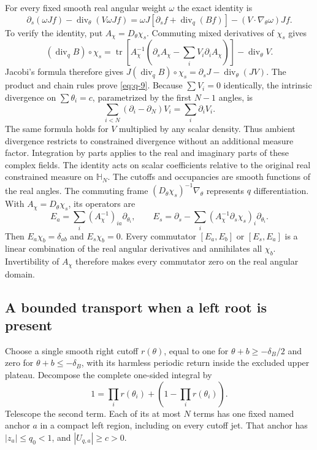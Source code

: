 \documentclass[11pt]{article}
\numberwithin{equation}{section}
\theoremstyle{remark}\newtheorem{remark}[theorem]{Remark}
\begin{document}
For every fixed smooth real angular weight $\omega$ the exact identity
is
\begin{equation}\label{eq:q-9}
\partial_s(\omega Jf)-\operatorname{div}_\theta(V\omega Jf)
 =\omega J[\partial_sf+\operatorname{div}_q(Bf)]
    -(V\cdot\nabla_\theta\omega)Jf.
\end{equation}
To verify the identity, put $A_\chi=D_\theta\chi_s$.
Commuting mixed derivatives of $\chi_s$ gives
\[
 (\operatorname{div}_qB)\circ\chi_s
 =\operatorname{tr}\!\left[A_\chi^{-1}
   \left(\partial_sA_\chi-\sum_iV_i\partial_iA_\chi\right)\right]
     -\operatorname{div}_\theta V.
\]
Jacobi's formula therefore gives
$J(\operatorname{div}_qB)\circ\chi_s
=\partial_sJ-\operatorname{div}_\theta(JV)$.
The product and chain rules prove \eqref{eq:q-9}. Because $\sum V_i=0$ identically, the intrinsic divergence on
$\sum\theta_i=c$, parametrized by the first $N-1$ angles, is
\[
 \sum_{i<N}(\partial_i-\partial_N)V_i=\sum_i\partial_iV_i.
\]
The same formula holds for $V$ multiplied by any scalar density.
Thus ambient divergence restricts to constrained divergence without
an additional measure factor. Integration by parts applies to the
real and imaginary parts of these complex fields.
The identity acts on scalar coefficients relative to the original
real constrained measure on $\mathbb H_N$. The cutoffs and
occupancies are smooth functions of the real angles.
The commuting frame $(D_\theta\chi_s)^{-1}\nabla_\theta$ represents
$q$ differentiation. With $A_\chi=D_\theta\chi_s$, its operators are
\[
 E_a=\sum_i(A_\chi^{-1})_{ia}\partial_{\theta_i},\qquad
 E_s=\partial_s-
       \sum_i(A_\chi^{-1}\partial_s\chi_s)_i\partial_{\theta_i}.
\]
Then $E_a\chi_b=\delta_{ab}$ and $E_s\chi_b=0$. Every commutator
$[E_a,E_b]$ or $[E_s,E_a]$ is a linear combination of the real
angular derivatives and annihilates all $\chi_b$. Invertibility of
$A_\chi$ therefore makes every commutator zero on the real angular domain.

\subsection{A bounded transport when a left root is present}\label{sec:left-gap}

Choose a single smooth right cutoff $r(\theta)$, equal to one for
$\theta+b\ge-\delta_B/2$ and zero for
$\theta+b\le-\delta_B$, with its harmless periodic return inside the
excluded upper plateau. Decompose the complete one-sided integral by
\[
 1=\prod_i r(\theta_i)+\left(1-\prod_i r(\theta_i)\right).
\]
Telescope the second term. Each of its at most $N$ terms has one fixed
named anchor $a$ in a compact left region, including on every cutoff
jet. That anchor has $|z_a|\le q_0<1$, and $|U_{q,a}|\ge c>0$.
\end{document}
